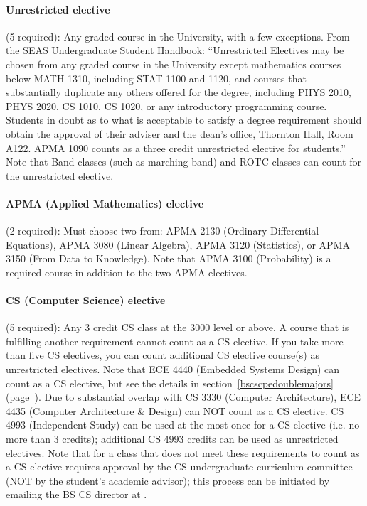 \paragraph{Unrestricted elective} (5 required): \label{csunrestricted} 
  Any graded course in the University, with a few exceptions. From the
  SEAS Undergraduate Student Handbook: ``Unrestricted
  Electives may be chosen from any graded course in the University
  except mathematics courses below MATH 1310, including STAT 1100 and
  1120, and courses that substantially duplicate any others offered
  for the degree, including PHYS 2010, PHYS 2020, CS 1010, CS 1020, or
  any introductory programming course. Students in doubt as to what is
  acceptable to satisfy a degree requirement should obtain the
  approval of their adviser and the dean's office, Thornton Hall, Room
  A122. APMA 1090 counts as a three credit unrestricted elective for
  students.''  Note that Band classes (such as marching band) and ROTC
  classes can count for the unrestricted elective.

\paragraph{APMA (Applied Mathematics) elective} (2 required): Must 
  choose two from: APMA 2130 (Ordinary Differential Equations), APMA
  3080 (Linear Algebra), APMA 3120 (Statistics), or APMA 3150 (From
  Data to Knowledge). Note that APMA 3100 (Probability) is a required
  course in addition to the two APMA electives.

\paragraph{CS (Computer Science) elective} (5 required): Any 3 credit CS class at the 3000
  level or above. A course that is fulfilling another requirement
  cannot count as a CS elective. If you take more than five CS
  electives, you can count additional CS elective course(s) as
  unrestricted electives. Note that
  ECE 4440 (Embedded Systems Design) can count as a CS elective, but
  see the details in section~\ref{bscscpedoublemajors}
  (page~\pageref{bscscpedoublemajors}).  Due to substantial overlap with
  CS 3330 (Computer Architecture), ECE 4435 (Computer Architecture \&
  Design) can NOT count as a CS elective.  CS 4993
  (Independent Study) can be used at the most once for a CS elective
  (i.e. no more than 3 credits); additional CS 4993 credits can be
  used as unrestricted electives. Note that for a class that does not
  meet these requirements to count as a CS elective requires approval
  by the CS undergraduate curriculum committee (NOT by the student's
  academic advisor); this process can be initiated by emailing the BS
  CS director at \bscsdirectoremail. 

